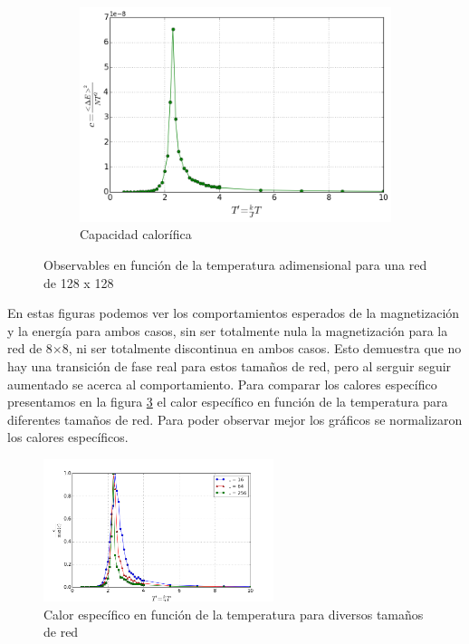 \documentclass[12pt,a4paper]{article}
\begin{document}
\begin{figure}[H]
\begin{subfigure}[c]{0.4\textwidth}
\centering
\includegraphics[width=\textwidth]{observables/c_L_128.png}
\caption{Capacidad calorífica}
\label{fig:c_L_128}
\end{subfigure}
\caption{Observables en función de la temperatura adimensional para una red de 128 x 128}
\label{fig:obs_L_128}
\end{figure}

En estas figuras podemos ver los comportamientos esperados de la magnetización y la energía para ambos casos, sin ser totalmente nula la magnetización para la red de 8$\times$8, ni ser totalmente discontinua en ambos casos. Esto demuestra que no hay una transición de fase real para estos tamaños de red, pero al serguir seguir aumentado se acerca al comportamiento.
Para comparar los calores específico  presentamos en la figura \ref{fig:c_L} el calor específico en función de la temperatura para diferentes tamaños de red. Para poder observar mejor los gráficos se normalizaron los calores específicos.

\begin{figure}[H]
\centering
\includegraphics[width = 0.6\textwidth]{observables/c_L_8_16_256}
\caption{Calor específico en función de la temperatura para diversos tamaños de red}
\label{fig:c_L}
\end{figure}
\end{document}
